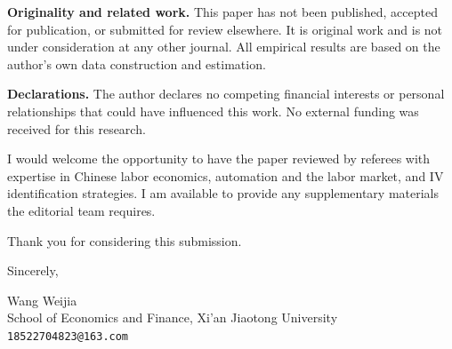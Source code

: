 \documentclass[12pt,a4paper]{article}
\begin{document}
\textbf{Originality and related work.} This paper has not been published, accepted for publication, or submitted for review elsewhere. It is original work and is not under consideration at any other journal. All empirical results are based on the author's own data construction and estimation.

\textbf{Declarations.} The author declares no competing financial interests or personal relationships that could have influenced this work. No external funding was received for this research.

I would welcome the opportunity to have the paper reviewed by referees with expertise in Chinese labor economics, automation and the labor market, and IV identification strategies. I am available to provide any supplementary materials the editorial team requires.

Thank you for considering this submission.

\bigskip

Sincerely,

\bigskip\bigskip

Wang Weijia\\
School of Economics and Finance, Xi'an Jiaotong University\\
\texttt{18522704823@163.com}
\end{document}
